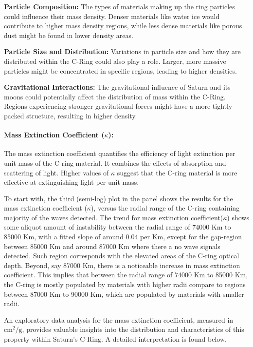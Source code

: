 \documentclass{article}
\begin{document}
\textbf{Particle Composition:} The types of materials making up the ring particles could influence their mass density. Denser materials like water ice would contribute to higher mass density regions, while less dense materials like porous dust might be found in lower density areas.

\textbf{Particle Size and Distribution:}  Variations in particle size and how they are distributed within the C-Ring could also play a role. Larger, more massive particles might be concentrated in specific regions, leading to higher densities.

\textbf{Gravitational Interactions:} The gravitational influence of Saturn and its moons could potentially affect the distribution of mass within the C-Ring. Regions experiencing stronger gravitational forces might have a more tightly packed structure, resulting in higher density.


\paragraph{Mass Extinction Coefficient ($\kappa$):}
The mass extinction coefficient quantifies the efficiency of light extinction per unit mass of the C-ring material. It combines the effects of absorption and scattering of light. Higher values of $\kappa$ suggest that the C-ring material is more effective at extinguishing light per unit mass.

To start with, the third (semi-log) plot in the panel shows the results for the mass extinction coefficient ($\kappa$), versus the radial range of the C-ring containing majority of the waves detected. The trend for mass extinction coefficient($\kappa$) shows some aliquot amount of instability between the radial range of 74000 Km to 85000 Km, with a fitted slope of around 0.04 per Km, except for the gap-region between 85000 Km and around 87000 Km where there a no wave signals detected. Such region corresponds with the elevated areas of the C-ring optical depth. Beyond, say 87000 Km, there is a noticeable increase in mass extinction coefficient. This implies that between the radial range of 74000 Km to 85000 Km, the C-ring is mostly populated by materials with higher radii compare to regions between 87000 Km to 90000 Km, which are populated by materials with smaller radii. 

An exploratory data analysis for the mass extinction coefficient, measured in \( \text{cm}^2/\text{g} \), provides valuable insights into the distribution and characteristics of this property within Saturn's C-Ring. A detailed interpretation is found below.
\end{document}
